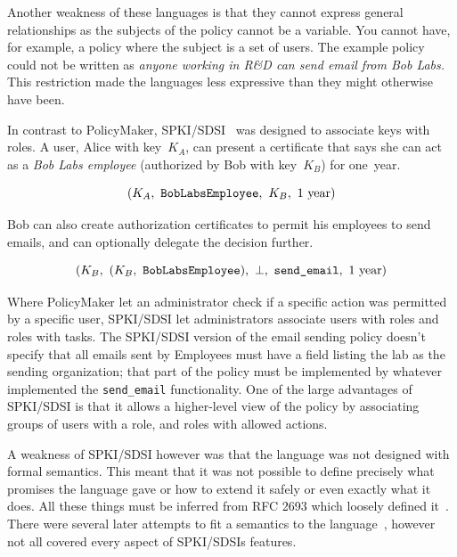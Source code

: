 \documentclass[thesis.tex]{subfiles}
\begin{document}
Another weakness of these languages is that they cannot express
general relationships as the subjects of the policy cannot be a
variable.  You cannot have, for example, a policy where the subject is
a set of users.  The example policy could not be written as
\emph{anyone working in R\&D can send email from Bob Labs.}  This
restriction made the languages less expressive than they might
otherwise have been.


In contrast to PolicyMaker, SPKI/SDSI~\cite{ellison_spki_1999} was
designed to associate keys with roles.  A user, Alice with key~$K_A$,
can present a certificate that says she can act as a \emph{Bob Labs
employee} (authorized by Bob with key~$K_B$) for one~year.

\begin{equation*}
  (K_A,~\text{\tt BobLabsEmployee},~K_B,~1~\text{year})
\end{equation*}

Bob can also create authorization certificates to permit his employees
to send emails, and can optionally delegate the decision further.

\begin{equation*}
 (K_B,~(K_B,~\text{\tt BobLabsEmployee}),~\bot,~\text{\ttfamily send\_email},~1~\text{year})
\end{equation*}

Where PolicyMaker let an administrator check if a specific action was permitted
by a specific user, SPKI/SDSI let administrators associate users with roles and
roles with tasks. The SPKI/SDSI version of the email sending policy doesn't
specify that all emails sent by Employees must have a field listing the lab as
the sending organization; that part of the policy must be implemented by
whatever implemented the \texttt{send\_email} functionality. One of the large
advantages of SPKI/SDSI is that it allows a higher-level view of the policy by
associating groups of users with a role, and roles with allowed actions.

A weakness of SPKI/SDSI however was that the language was not designed
with formal semantics.  This meant that it was not possible to define
precisely what promises the language gave or how to extend it safely
or even exactly what it does.  All these things must be inferred from
RFC 2693 which loosely defined it~\cite{ellison_spki_1999}. There were
several later attempts to fit a semantics to the
language~\cite{joseph_y._halpern_logic_1999,abadi_sdsis_1998,howell_formal_2000},
however not all covered every aspect of SPKI/SDSIs features.
\end{document}
